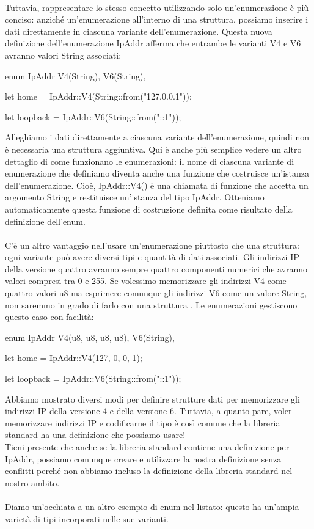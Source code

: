 \documentclass[11pt,a4paper]{article}
\begin{document}
\\
Tuttavia, rappresentare lo stesso concetto utilizzando solo un'enumerazione è più conciso: anziché un'enumerazione all'interno di una struttura, possiamo inserire i dati direttamente in ciascuna variante dell'enumerazione. Questa nuova definizione dell'enumerazione IpAddr afferma che entrambe le varianti V4 e V6 avranno valori String associati:
\begin{rust}
    enum IpAddr {
        V4(String),
        V6(String),
    }

    let home = IpAddr::V4(String::from("127.0.0.1"));

    let loopback = IpAddr::V6(String::from("::1"));
\end{rust}
Alleghiamo i dati direttamente a ciascuna variante dell'enumerazione, quindi non è necessaria una struttura aggiuntiva. Qui è anche più semplice vedere un altro dettaglio di come funzionano le enumerazioni: il nome di ciascuna variante di enumerazione che definiamo diventa anche una funzione che costruisce un'istanza dell'enumerazione. Cioè, IpAddr::V4() è una chiamata di funzione che accetta un argomento String e restituisce un'istanza del tipo IpAddr. Otteniamo automaticamente questa funzione di costruzione definita come risultato della definizione dell'enum.\\
\\
C'è un altro vantaggio nell'usare un'enumerazione piuttosto che una struttura: ogni variante può avere diversi tipi e quantità di dati associati. Gli indirizzi IP della versione quattro avranno sempre quattro componenti numerici che avranno valori compresi tra 0 e 255. Se volessimo memorizzare gli indirizzi V4 come quattro valori u8 ma esprimere comunque gli indirizzi V6 come un valore String, non saremmo in grado di farlo con una struttura . Le enumerazioni gestiscono questo caso con facilità:
\begin{rust}
    enum IpAddr {
        V4(u8, u8, u8, u8),
        V6(String),
    }

    let home = IpAddr::V4(127, 0, 0, 1);

    let loopback = IpAddr::V6(String::from("::1"));
\end{rust}
Abbiamo mostrato diversi modi per definire strutture dati per memorizzare gli indirizzi IP della versione 4 e della versione 6. Tuttavia, a quanto pare, voler memorizzare indirizzi IP e codificarne il tipo è così comune che la libreria standard ha una definizione che possiamo usare!\\
Tieni presente che anche se la libreria standard contiene una definizione per IpAddr, possiamo comunque creare e utilizzare la nostra definizione senza conflitti perché non abbiamo incluso la definizione della libreria standard nel nostro ambito.\\
\\
Diamo un'occhiata a un altro esempio di enum nel listato: questo ha un'ampia varietà di tipi incorporati nelle sue varianti.
\end{document}
